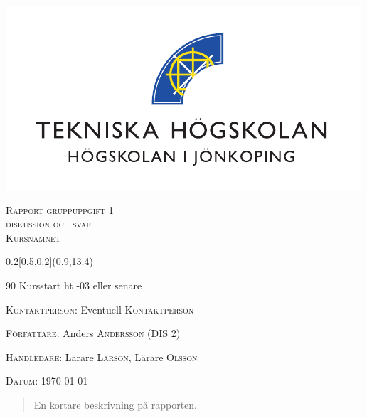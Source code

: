 \begin{center}

\includegraphics[width=12.2 cm]{Bilder/JTH_cmyk_B-eps-converted-to.pdf}\centering


 \begin{center}
\textsc{\LARGE  Rapport gruppuppgift 1\\diskussion och svar}\\[1.5cm]


\textsc{\Large Kursnamnet}\\[0.5cm]
\end{center}




\begin{textblock}{0.2}[0.5,0.2](0.9,13.4)
\begin{rotate}{90}
\footnotesize Kursstart ht -03 eller senare
\end{rotate}
\end{textblock}
 
 
\vfill
\begin{flushleft} \large
\textsc{Kontaktperson:}
Eventuell \textsc{Kontaktperson}

\textsc{Författare:}
Anders \textsc{Andersson} (DIS 2)

\large
\textsc{Handledare:} 
Lärare \textsc{Larson}, Lärare \textsc{Olsson}

\textsc{Datum:}
\today 

\end{flushleft}

\end{center}
\thispagestyle{empty}
\pagebreak

\begin{abstract}
En kortare beskrivning på rapporten.
\end{abstract}
\setcounter{page}{1}
\newpage
\tableofcontents

\newpage